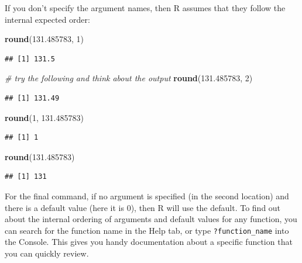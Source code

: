 \documentclass[
]{book}
\newenvironment{Shaded}{\begin{snugshade}}{\end{snugshade}}
\newcommand{\CommentTok}[1]{\textcolor[rgb]{0.56,0.35,0.01}{\textit{#1}}}
\newcommand{\DecValTok}[1]{\textcolor[rgb]{0.00,0.00,0.81}{#1}}
\newcommand{\FloatTok}[1]{\textcolor[rgb]{0.00,0.00,0.81}{#1}}
\newcommand{\FunctionTok}[1]{\textcolor[rgb]{0.13,0.29,0.53}{\textbf{#1}}}
\newcommand{\NormalTok}[1]{#1}
\begin{document}
If you don't specify the argument names, then R assumes that they follow the internal expected order:

\begin{Shaded}
\begin{Highlighting}[]
\FunctionTok{round}\NormalTok{(}\FloatTok{131.485783}\NormalTok{, }\DecValTok{1}\NormalTok{)}
\end{Highlighting}
\end{Shaded}

\begin{verbatim}
## [1] 131.5
\end{verbatim}

\begin{Shaded}
\begin{Highlighting}[]
\CommentTok{\# try the following and think about the output}
\FunctionTok{round}\NormalTok{(}\FloatTok{131.485783}\NormalTok{, }\DecValTok{2}\NormalTok{)}
\end{Highlighting}
\end{Shaded}

\begin{verbatim}
## [1] 131.49
\end{verbatim}

\begin{Shaded}
\begin{Highlighting}[]
\FunctionTok{round}\NormalTok{(}\DecValTok{1}\NormalTok{, }\FloatTok{131.485783}\NormalTok{)}
\end{Highlighting}
\end{Shaded}

\begin{verbatim}
## [1] 1
\end{verbatim}

\begin{Shaded}
\begin{Highlighting}[]
\FunctionTok{round}\NormalTok{(}\FloatTok{131.485783}\NormalTok{)}
\end{Highlighting}
\end{Shaded}

\begin{verbatim}
## [1] 131
\end{verbatim}

For the final command, if no argument is specified (in the second location) and there is a default value (here it is 0), then R will use the default. To find out about the internal ordering of arguments and default values for any function, you can search for the function name in the Help tab, or type \texttt{?function\_name} into the Console. This gives you handy documentation about a specific function that you can quickly review.
\end{document}
